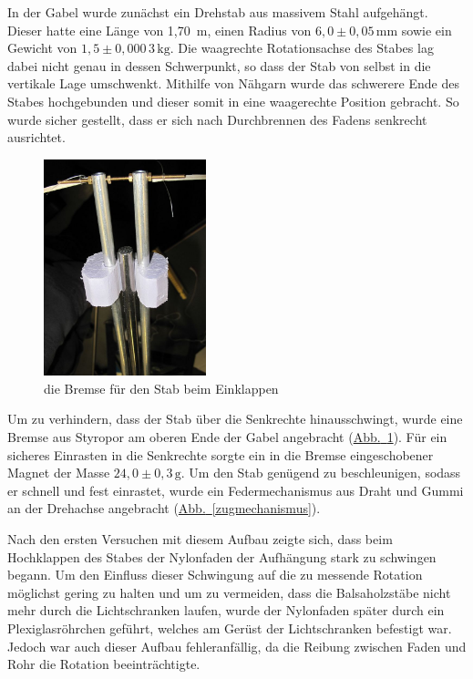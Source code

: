 \documentclass[halfparskip, 11pt]{scrartcl}
\newcommand{\unit}[1]{\ensuremath{\,\mathrm{#1}}} %
\newcommand{\hypref}[2]{\hyperref[#2]{{#1}~\ref{#2}}}
\begin{document}
In der Gabel wurde zun\"achst ein Drehstab aus massivem Stahl aufgeh\"angt. Dieser hatte eine L\"ange von 1,70 \unit{m}, einen Radius von $6,0\pm 0,05\unit{mm}$ sowie ein Gewicht von $1,5\pm 0,000\,3\unit{kg}$. Die waagrechte Rotationsachse des Stabes lag dabei nicht genau in dessen Schwerpunkt, so dass der Stab von selbst in die vertikale Lage umschwenkt. Mithilfe von N\"ahgarn wurde das schwerere Ende des Stabes hochgebunden und dieser somit in eine waagerechte Position gebracht. So wurde sicher gestellt, dass er sich nach Durchbrennen des Fadens senkrecht ausrichtet.

\begin{figure}[ht]
\centering
\includegraphics[width=0.42\textwidth]{styropor.jpg}
\caption{die Bremse für den Stab beim Einklappen}
\label{fig:styropor}
\end{figure}

Um zu verhindern, dass der Stab \"uber die Senkrechte hinausschwingt, wurde eine Bremse aus Styropor am oberen Ende der Gabel angebracht (\hypref{Abb.}{fig:styropor}). F\"ur ein sicheres Einrasten in die Senkrechte sorgte ein in die Bremse eingeschobener Magnet der Masse $24,0 \pm 0,3\unit{g}$. Um den Stab gen\"ugend zu beschleunigen, sodass er schnell und fest einrastet, wurde ein Federmechanismus aus Draht und Gummi an der Drehachse angebracht (\hypref{Abb.}{zugmechanismus}).

Nach den ersten Versuchen mit diesem Aufbau zeigte sich, dass beim Hochklappen des Stabes der Nylonfaden der Aufh\"angung stark zu schwingen begann. Um den Einfluss dieser Schwingung auf die zu messende Rotation m\"oglichst gering zu halten und um zu vermeiden, dass die Balsaholzst\"abe nicht mehr durch die Lichtschranken laufen, wurde der Nylonfaden sp\"ater durch ein Plexiglasr\"ohrchen gef\"uhrt, welches am Gerüst der Lichtschranken befestigt war. Jedoch war auch dieser Aufbau fehleranf\"allig, da die Reibung zwischen Faden und Rohr die Rotation beeintr\"achtigte.
\end{document}

